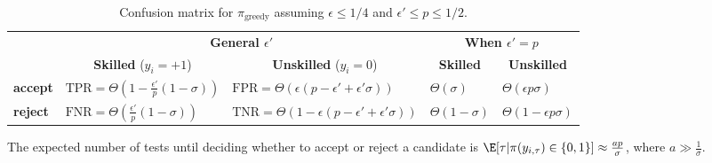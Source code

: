 \begin{table}
\begin{center}
\caption{Confusion matrix for $\pi_{\text{greedy}}$
assuming $\epsilon\leq 1/4$ and $\epsilon'\leq p\leq 1/2$.
}
\small
\begin{tabular}{l|ll|ll}
\multicolumn{1}{c}{} &\multicolumn{2}{c}{\textbf{General $\epsilon'$}}&\multicolumn{2}{c}{\textbf{When $\epsilon' = p$}} \\ 
\multicolumn{1}{c}{} & 
\multicolumn{1}{c}{\textbf{Skilled}  ($y_i=+1$)} & 
\multicolumn{1}{c}{\textbf{Unskilled} ($y_i=0$)} &
\multicolumn{1}{c}{\textbf{Skilled} } & 
\multicolumn{1}{c}{\textbf{Unskilled} }
\\ 
\toprule
\textbf{accept} & $\text{TPR}=\Theta\left(1-\frac{\epsilon'}{p}(1-\sigma)\right)$ & $\text{FPR}=\Theta\left(\epsilon(p-\epsilon'+\epsilon'\sigma) \right)$  &$ \Theta(\sigma)$&$ \Theta(\epsilon p \sigma)$ \\
\textbf{reject} & $\text{FNR}=\Theta\left(\frac{\epsilon'}{p}(1-\sigma)\right)$   & $\text{TNR}=\Theta\left(1-\epsilon(p-\epsilon'+\epsilon'\sigma) \right)$ & $ \Theta(1-\sigma)$ &$\Theta(1-\epsilon p \sigma)$\\ 
\bottomrule
\end{tabular}
\label{tab:confMat}
\end{center}
\end{table}


\begin{theorem}\label{thm:expectedNumOfTestsUntilDecision}
The expected number of tests until deciding whether to accept or reject a candidate is $
\E[\tau|{\pi(y_{i,\tau})\in \{0,1\}}]
\approx \frac{ap}{\sigma}$, where 
$a\gg\frac{1}{\sigma}$.
\end{theorem}
